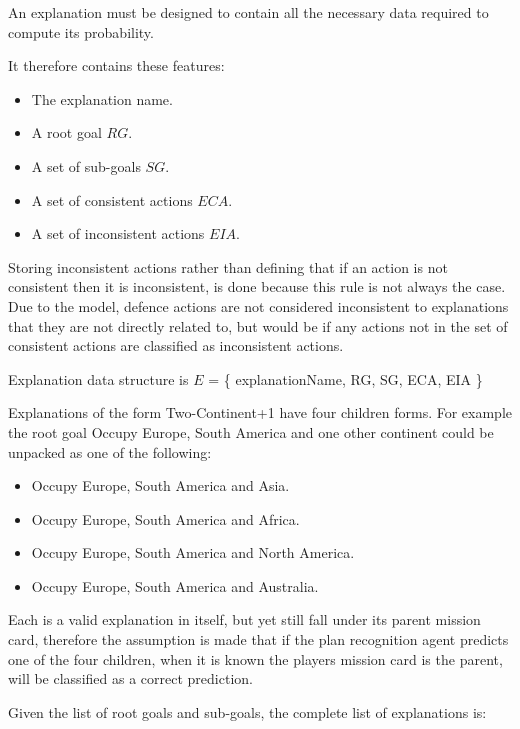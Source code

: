 \documentclass[parskip]{cs4rep}
\begin{document}
An explanation must be designed to contain all the necessary data required to compute its probability.

It therefore contains these features:

\begin{itemize}
\item
The explanation name.
\item
A root goal $RG$.
\item
A set of sub-goals $SG$.
\item
A set of consistent actions $ECA$.
\item
A set of inconsistent actions $EIA$.
\end{itemize}

Storing inconsistent actions rather than defining that if an action is not consistent then it is inconsistent, is done because this rule is not always the case. Due to the model, defence actions are not considered inconsistent to explanations that they are not directly related to, but would be if any actions not in the set of consistent actions are classified as inconsistent actions.

Explanation data structure is $E$ = \{ explanationName, RG, SG, ECA, EIA \}

Explanations of the form Two-Continent+1 have four children forms. For example the root goal Occupy Europe, South America and one other continent could be unpacked as one of the following:

\begin{itemize}
\item
Occupy Europe, South America and Asia.
\item
Occupy Europe, South America and Africa.
\item
Occupy Europe, South America and North America.
\item
Occupy Europe, South America and Australia.
\end{itemize}

Each is a valid explanation in itself, but yet still fall under its parent mission card, therefore the assumption is made that if the plan recognition agent predicts one of the four children, when it is known the players mission card is the parent, will be classified as a correct prediction.

Given the list of root goals and sub-goals, the complete list of explanations is:
\end{document}
